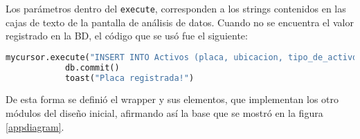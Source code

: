 \par
Los parámetros dentro del \verb|execute|, corresponden a los strings contenidos en las cajas de texto de la pantalla de análisis de datos. Cuando no se encuentra el valor registrado en la BD, el código que se usó fue el siguiente:
\begin{lstlisting}[language=Python,frame=single,caption= Registro nuevo de activo (creación propia), inputencoding=latin1]
mycursor.execute("INSERT INTO Activos (placa, ubicacion, tipo_de_activo, descripcion) VALUES (%s, %s, %s, %s)", (self.placa_actual, self.root.ids.ubicacion.text, self.root.ids.active_type.text, self.root.ids.descrip.text))
            db.commit()
            toast("Placa registrada!")
\end{lstlisting}
\par
De esta forma se definió el wrapper y sus elementos, que implementan los otro módulos del diseño inicial, afirmando así la base que se mostró en la figura \ref{appdiagram}. 






